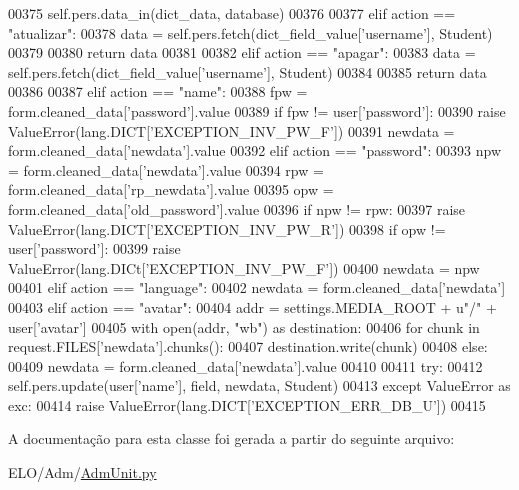 \begin{DoxyCode}
00375                 self.pers.data\_in(dict\_data, database)
00376 
00377         \textcolor{keywordflow}{elif} action == \textcolor{stringliteral}{"atualizar"}:
00378             data = self.pers.fetch(dict\_field\_value[\textcolor{stringliteral}{'username'}], Student)
00379 
00380             \textcolor{keywordflow}{return} data
00381 
00382         \textcolor{keywordflow}{elif} action == \textcolor{stringliteral}{"apagar"}:
00383             data = self.pers.fetch(dict\_field\_value[\textcolor{stringliteral}{'username'}], Student)
00384 
00385             \textcolor{keywordflow}{return} data
00386 
00387         \textcolor{keywordflow}{elif} action == \textcolor{stringliteral}{"name"}:
00388             fpw = form.cleaned\_data[\textcolor{stringliteral}{'password'}].value
00389             \textcolor{keywordflow}{if} fpw != user[\textcolor{stringliteral}{'password'}]:
00390                 \textcolor{keywordflow}{raise} ValueError(lang.DICT[\textcolor{stringliteral}{'EXCEPTION\_INV\_PW\_F'}])
00391             newdata = form.cleaned\_data[\textcolor{stringliteral}{'newdata'}].value
00392         \textcolor{keywordflow}{elif} action == \textcolor{stringliteral}{"password"}:
00393             npw = form.cleaned\_data[\textcolor{stringliteral}{'newdata'}].value
00394             rpw = form.cleaned\_data[\textcolor{stringliteral}{'rp\_newdata'}].value
00395             opw = form.cleaned\_data[\textcolor{stringliteral}{'old\_password'}].value
00396             \textcolor{keywordflow}{if} npw != rpw:
00397                 \textcolor{keywordflow}{raise} ValueError(lang.DICT[\textcolor{stringliteral}{'EXCEPTION\_INV\_PW\_R'}])
00398             \textcolor{keywordflow}{if} opw != user[\textcolor{stringliteral}{'password'}]:
00399                 \textcolor{keywordflow}{raise} ValueError(lang.DICt[\textcolor{stringliteral}{'EXCEPTION\_INV\_PW\_F'}])
00400             newdata = npw
00401         \textcolor{keywordflow}{elif} action == \textcolor{stringliteral}{"language"}:
00402             newdata = form.cleaned\_data[\textcolor{stringliteral}{'newdata'}]
00403         \textcolor{keywordflow}{elif} action == \textcolor{stringliteral}{"avatar"}:
00404             addr = settings.MEDIA\_ROOT + \textcolor{stringliteral}{u"/"} + user[\textcolor{stringliteral}{'avatar'}]
00405             with open(addr, \textcolor{stringliteral}{"wb"}) \textcolor{keyword}{as} destination:
00406                     \textcolor{keywordflow}{for} chunk \textcolor{keywordflow}{in} request.FILES[\textcolor{stringliteral}{'newdata'}].chunks():
00407                         destination.write(chunk)
00408         \textcolor{keywordflow}{else}:
00409             newdata = form.cleaned\_data[\textcolor{stringliteral}{'newdata'}].value
00410 
00411         \textcolor{keywordflow}{try}:
00412             self.pers.update(user[\textcolor{stringliteral}{'name'}], field, newdata, Student)
00413         \textcolor{keywordflow}{except} ValueError \textcolor{keyword}{as} exc:
00414             \textcolor{keywordflow}{raise} ValueError(lang.DICT[\textcolor{stringliteral}{'EXCEPTION\_ERR\_DB\_U'}])
00415 

\end{DoxyCode}


A documentação para esta classe foi gerada a partir do seguinte arquivo\-:\begin{DoxyCompactItemize}
\item 
E\-L\-O/\-Adm/\hyperlink{AdmUnit_8py}{Adm\-Unit.\-py}\end{DoxyCompactItemize}
